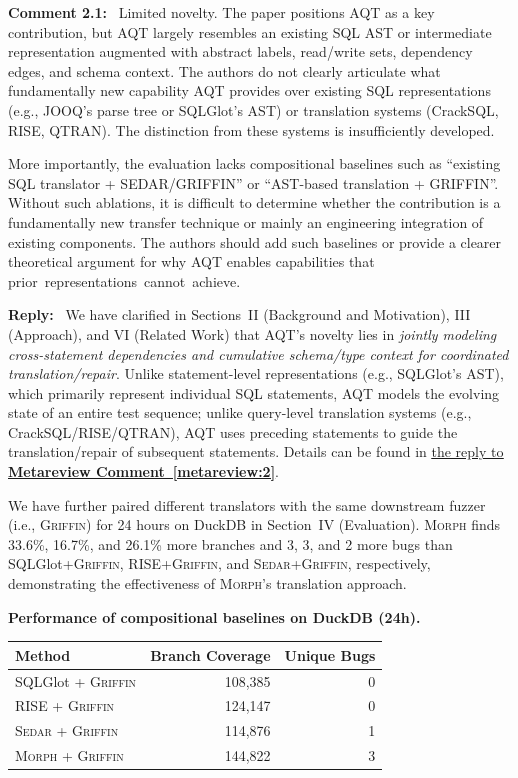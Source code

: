 \documentclass[12pt,letterpaper]{article}
\renewcommand{\arraystretch}{1.15}
\newcommand{\morph}{\textsc{Morph}}
\newcommand{\sedar}{\textsc{Sedar}}
\newcommand{\griffin}{\textsc{Griffin}}
\newcommand{\tool}{\morph}
\newcommand{\reviewstart}{\par\addvspace{0.85\baselineskip}\Needspace{4\baselineskip}\noindent}
\newcounter{commentanchor}
\newcommand{\reviewcomment}[1]{\reviewstart\renewcommand{\thecommentanchor}{#1}\refstepcounter{commentanchor}\label{comment:#1}\textbf{Comment #1:}\ }
\newcommand{\metareviewref}[1]{\hyperref[metareview:#1]{\uline{the reply to \textbf{Metareview Comment~\ref*{metareview:#1}}}}}
\newcommand{\reply}{\par\nobreak\noindent\textbf{Reply:}\ }
\begin{document}

\reviewcomment{2.1} Limited novelty. The paper positions AQT as a key contribution, but AQT largely resembles an existing SQL AST or intermediate representation augmented with abstract labels, read/write sets, dependency edges, and schema context. The authors do not clearly articulate what fundamentally new capability AQT provides over existing SQL representations (e.g., JOOQ's parse tree or SQLGlot's AST) or translation systems (CrackSQL, RISE, QTRAN). The distinction from these systems is insufficiently developed.

More importantly, the evaluation lacks compositional baselines such as ``existing SQL translator + SEDAR/GRIFFIN'' or ``AST-based translation + GRIFFIN''. Without such ablations, it is difficult to determine whether the contribution is a fundamentally new transfer technique or mainly an engineering integration of existing components. The authors should add such baselines or provide a clearer theoretical argument for why AQT enables capabilities that \mbox{prior representations cannot achieve.}

\reply
We have clarified in Sections~II (Background and Motivation), III (Approach), and VI (Related Work) that AQT's novelty lies in \textit{jointly modeling cross-statement dependencies and cumulative schema/type context for coordinated translation/repair}. Unlike statement-level representations (e.g., SQLGlot's AST), which primarily represent individual SQL statements, AQT models the evolving state of an entire test sequence; unlike query-level translation systems (e.g., CrackSQL/RISE/QTRAN), AQT uses preceding statements to guide the translation/repair of subsequent statements. Details can be found in \metareviewref{2}.

We have further paired different translators with the same downstream fuzzer (i.e., \griffin{}) for 24 hours on DuckDB in Section~IV (Evaluation). \tool{} finds 33.6\%, 16.7\%, and 26.1\% more branches and 3, 3, and 2 more bugs than SQLGlot+\griffin{}, RISE+\griffin{}, and \sedar{}+\griffin{}, respectively, demonstrating the effectiveness of \tool{}'s translation approach.

\begin{center}
\begin{minipage}{0.6\linewidth}
\centering\scriptsize\renewcommand{\arraystretch}{1.0}
\textbf{Performance of compositional baselines on DuckDB (24h).}
\par\smallskip
\begin{tabular}{lrr}
\toprule
Method & Branch Coverage & Unique Bugs \\
\midrule
SQLGlot + \griffin{} & 108,385 & 0 \\
RISE + \griffin{} & 124,147 & 0 \\
\sedar{} + \griffin{} & 114,876 & 1 \\
\tool{} + \griffin{} & 144,822 & 3 \\
\bottomrule
\end{tabular}
\end{minipage}
\end{center}
\end{document}
